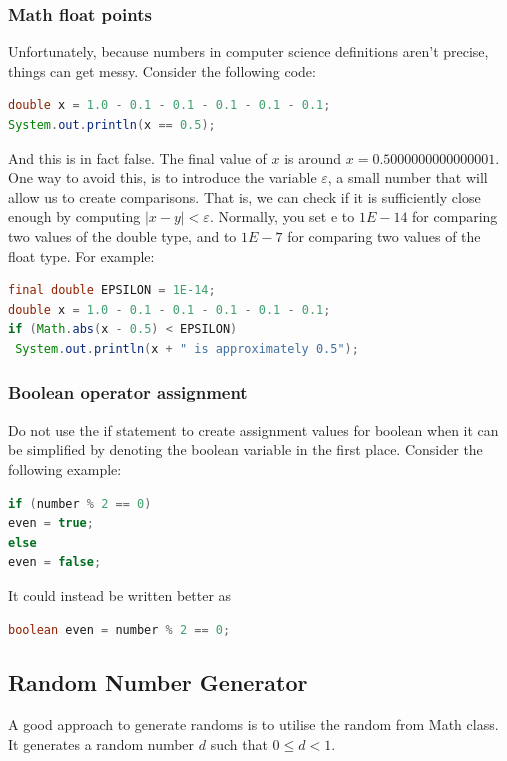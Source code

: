 \documentclass[11pt,a4 paper]{book}
\theoremstyle{plain}
\theoremstyle{definition}
\theoremstyle{remark}
\begin{document}
\begin{flushleft}
\subsubsection{Math float points}
Unfortunately, because numbers in computer science definitions aren't precise, things can get messy. Consider the following code:
\begin{lstlisting}[language=Java]
double x = 1.0 - 0.1 - 0.1 - 0.1 - 0.1 - 0.1;
System.out.println(x == 0.5);
\end{lstlisting}
And this is in fact false. The final value of $x$ is around $x=0.5000000000000001$. One way to avoid this, is to introduce the variable $\varepsilon$, a small number that will allow us to create comparisons. That is, we can check if it is sufficiently close enough by computing $|x-y|<\varepsilon$.  Normally, you set e
to $1E-14$ for comparing two values of the double type, and to $1E-7$ for comparing two values of the float type. For example:
\begin{lstlisting}[language=Java]
final double EPSILON = 1E-14;
double x = 1.0 - 0.1 - 0.1 - 0.1 - 0.1 - 0.1;
if (Math.abs(x - 0.5) < EPSILON)
 System.out.println(x + " is approximately 0.5");
 \end{lstlisting}
 \subsubsection{Boolean operator assignment}
Do not use the if statement to create assignment values for boolean when it can be simplified by denoting the boolean variable in the first place. Consider the following example:
\begin{lstlisting}[language=Java]
if (number % 2 == 0)
even = true;
else
even = false;
\end{lstlisting}
It could instead be written better as 
\begin{lstlisting}[language=Java]
boolean even = number % 2 == 0;
\end{lstlisting}
\subsection{Random Number Generator}
A good approach to generate randoms is to utilise the random from Math class. It generates a random number $d$ such that $0 \leq d < 1$. 

\end{flushleft}
\end{document}
